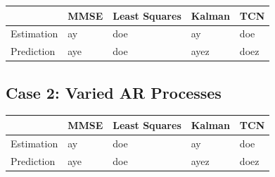 \documentclass[twocolumn,letterpaper]{IEEEAerospaceCLS}  %
\begin{document}
\begin{table}[!h]
\begin{tabular}{|l|l|l|l|l|}
\hline
                            & MMSE                 & Least Squares        & Kalman         & TCN                   \\ \hline
\multirow{3}{*}{Estimation} & \multirow{3}{*}{ay}  & \multirow{3}{*}{doe} & \multirow{3}{*}{ay}   & \multirow{3}{*}{doe}  \\
                            &                      &                      &                       &                       \\
                            &                      &                      &                       &                       \\ \hline
\multirow{3}{*}{Prediction} & \multirow{3}{*}{aye} & \multirow{3}{*}{doe} & \multirow{3}{*}{ayez} & \multirow{3}{*}{doez} \\
                            &                      &                      &                       &                       \\
                            &                      &                      &                       &                       \\ \hline
\end{tabular}
\end{table}

\newpage

\subsection{Case 2: Varied AR Processes}

\begin{table}[!h]
\begin{tabular}{|l|l|l|l|l|}
\hline
                            & MMSE                 & Least Squares        & Kalman         & TCN                   \\ \hline
\multirow{3}{*}{Estimation} & \multirow{3}{*}{ay}  & \multirow{3}{*}{doe} & \multirow{3}{*}{ay}   & \multirow{3}{*}{doe}  \\
                            &                      &                      &                       &                       \\
                            &                      &                      &                       &                       \\ \hline
\multirow{3}{*}{Prediction} & \multirow{3}{*}{aye} & \multirow{3}{*}{doe} & \multirow{3}{*}{ayez} & \multirow{3}{*}{doez} \\
                            &                      &                      &                       &                       \\
                            &                      &                      &                       &                       \\ \hline
\end{tabular}
\end{table}
\end{document}
